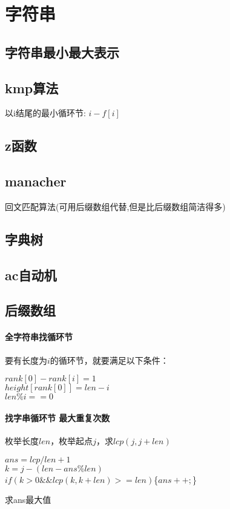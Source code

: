 \section{字符串}
\subsection{字符串最小最大表示}


\subsection{kmp算法}
以i结尾的最小循环节: $i-f[i]$


\subsection{z函数}


\subsection{manacher}
回文匹配算法(可用后缀数组代替,但是比后缀数组简洁得多)


\subsection{字典树}


\subsection{ac自动机}


\subsection{后缀数组}
\paragraph{全字符串找循环节}
要有长度为$i$的循环节，就要满足以下条件：
\begin{center}
    $rank[0]−rank[i]=1$ \\
    $height[rank[0]]=len−i$ \\
    $len\%i==0$
\end{center}
\paragraph{找字串循环节 最大重复次数}
枚举长度$len$，枚举起点$j$，求$lcp(j,j+len)$
\begin{center}
    $ans=lcp/len+1$ \\
    $k=j-(len-ans\%len)$ \\
    $if(k>0\&\&lcp(k,k+len)>=len)$\{$ans++;$\}
\end{center}
求ans最大值
